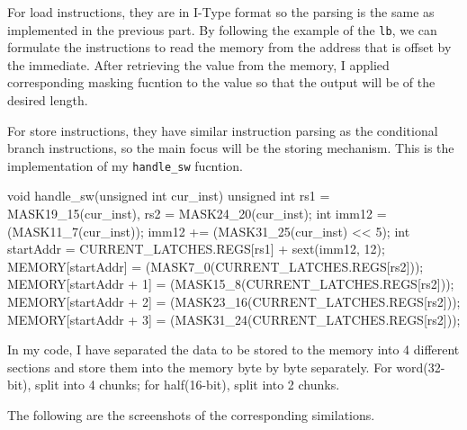 \documentclass[12pt, a4paper]{article}
\begin{document}
\begin{ans}
For load instructions, they are in I-Type format so the parsing is the same as implemented in the previous part. 
By following the example of the \texttt{lb}, we can formulate the instructions to read the memory from the address that is offset by the immediate. 
After retrieving the value from the memory, I applied corresponding masking fucntion to the value so that the output will be of the desired length. 

For store instructions, they have similar instruction parsing as the conditional branch instructions, so the main focus will be the storing mechanism. 
This is the implementation of my \texttt{handle\_sw} fucntion. 

\begin{code}
void handle_sw(unsigned int cur_inst) {
    unsigned int rs1 = MASK19_15(cur_inst), rs2 = MASK24_20(cur_inst);
    int imm12 = (MASK11_7(cur_inst));
    imm12 += (MASK31_25(cur_inst) << 5);
    int startAddr = CURRENT_LATCHES.REGS[rs1] + sext(imm12, 12);
    MEMORY[startAddr] = (MASK7_0(CURRENT_LATCHES.REGS[rs2]));
    MEMORY[startAddr + 1] = (MASK15_8(CURRENT_LATCHES.REGS[rs2]));
    MEMORY[startAddr + 2] = (MASK23_16(CURRENT_LATCHES.REGS[rs2]));
    MEMORY[startAddr + 3] = (MASK31_24(CURRENT_LATCHES.REGS[rs2]));
}
\end{code}
In my code, I have separated the data to be stored to the memory into 4 different sections and store 
them into the memory byte by byte separately. For word(32-bit), split into 4 chunks; for half(16-bit), split into 2 chunks. 

\end{ans}
\pagebreak
The following are the screenshots of the corresponding similations. 



\end{document}
